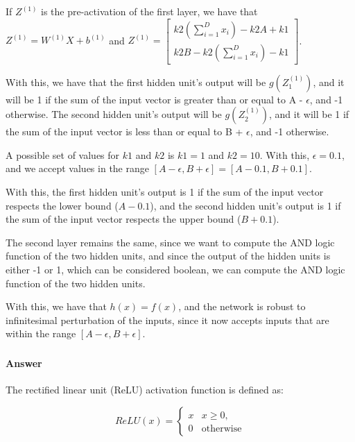 \documentclass{article}
\begin{document}
\bigskip

If $Z^{(1)}$ is the pre-activation of the first layer, we have that $Z^{(1)} = W^{(1)}X + b^{(1)}$ and
$Z^{(1)} = \begin{bmatrix}
    k2(\sum_{i=1}^{D} x_i) - k2A + k1\\
    k2B - k2(\sum_{i=1}^{D} x_i) - k1
\end{bmatrix}
$.

\bigskip

With this, we have that the first hidden unit's output will be $g(Z^{(1)}_1)$, and it will be 1 if the sum of the 
input vector is greater than or equal to A - $\epsilon$, and -1 otherwise. The second hidden unit's output will be $g(Z^{(1)}_2)$,
and it will be 1 if the sum of the input vector is less than or equal to B + $\epsilon$, and -1 otherwise.

A possible set of values for $k1$ and $k2$ is $k1 = 1$ and $k2 = 10$. With this, $\epsilon = 0.1$, and we accept values in
the range $[A - \epsilon, B + \epsilon] = [A - 0.1, B + 0.1]$.

With this, the first hidden unit's output is 1 if the sum of the input vector respects the lower bound ($A - 0.1$),
and the second hidden unit's output is 1 if the sum of the input vector respects the upper bound ($B + 0.1$).

The second layer remains the same, since we want to compute the AND logic function of the two hidden units, and since the output of
the hidden units is either -1 or 1, which can be considered boolean, we can compute the AND logic function of the two hidden units.

\bigskip

With this, we have that \(h(x) = f(x)\), and the network is robust to infinitesimal perturbation of the inputs, since it now accepts inputs
that are within the range \([A - \epsilon, B + \epsilon]\).

\subsubsection{}

\paragraph{Answer}

The rectified linear unit (ReLU) activation function is defined as:

\[ 
    ReLU(x) = 
    \begin{cases}
        x & x \geq 0, \\
        0 & \text{otherwise}
    \end{cases}
\]
\end{document}
